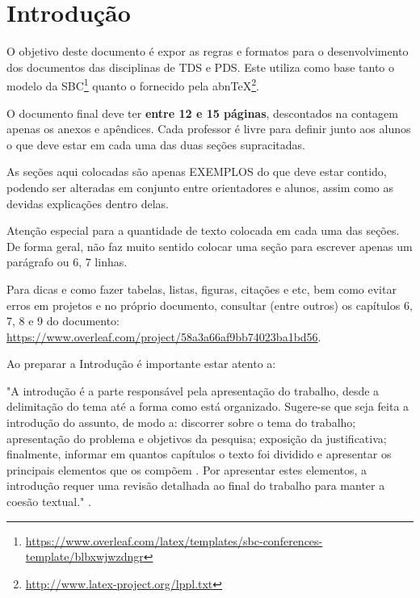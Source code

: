 \documentclass[
	article,			%
	12pt,				%
	oneside,			%
	a4paper,			%
	english,			%
	brazil,				%
	sumario=tradicional
	]{abntex2}
\begin{document}
\textual

\section{Introdução}
O objetivo deste documento é expor as regras e formatos para o desenvolvimento dos documentos das disciplinas de TDS e PDS. Este utiliza como base tanto o modelo da SBC\footnote{\url{https://www.overleaf.com/latex/templates/sbc-conferences-template/blbxwjwzdngr}} quanto o fornecido pela abnTeX\footnote{\url{http://www.latex-project.org/lppl.txt}}.

O documento final deve ter \textbf{entre 12 e 15 páginas}, descontados na contagem apenas os anexos e apêndices. Cada professor é livre para definir junto aos alunos o que deve estar em cada uma das duas seções supracitadas.

As seções aqui colocadas são apenas EXEMPLOS do que deve estar contido, podendo ser alteradas em conjunto entre orientadores e alunos, assim como as devidas explicações dentro delas.

Atenção especial para a quantidade de texto colocada em cada uma das seções. De forma geral, não faz muito sentido colocar uma seção para escrever apenas um parágrafo ou 6, 7 linhas.

Para dicas e como fazer tabelas, listas, figuras, citações e etc, bem como evitar erros em projetos e no próprio documento, consultar (entre outros) os capítulos 6, 7, 8 e 9 do documento: \url{https://www.overleaf.com/project/58a3a66af9bb74023ba1bd56}.


Ao preparar a Introdução é importante estar atento a:
    \begin{citacao}
    "A introdução é a parte responsável pela apresentação do trabalho, desde a delimitação do tema até a forma como está organizado. Sugere-se que seja feita a introdução do assunto, de modo a: discorrer sobre o tema do trabalho; apresentação do problema e objetivos da pesquisa; exposição da justificativa; finalmente, informar em quantos capítulos o texto foi dividido e apresentar os principais elementos que os compõem . Por apresentar estes elementos, a introdução requer uma revisão detalhada ao final do trabalho para manter a coesão textual."  \cite{NormalizacaoIFSP}.
    \end{citacao}
\end{document}
